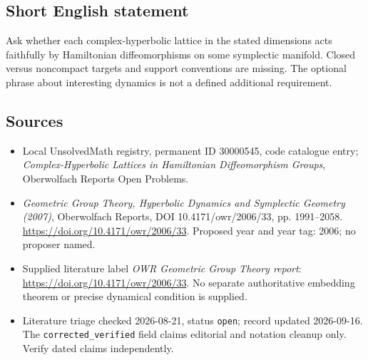 \documentclass[11pt]{article}
\begin{document}
\subsection{Short English statement}
Ask whether each complex-hyperbolic lattice in the stated dimensions acts faithfully by Hamiltonian diffeomorphisms on some symplectic manifold. Closed versus noncompact targets and support conventions are missing. The optional phrase about interesting dynamics is not a defined additional requirement.
\subsection{Sources}
\begin{itemize}\item Local UnsolvedMath registry, permanent ID 30000545, code catalogue entry; \emph{Complex-Hyperbolic Lattices in Hamiltonian Diffeomorphism Groups}, Oberwolfach Reports Open Problems.\item \emph{Geometric Group Theory, Hyperbolic Dynamics and Symplectic Geometry (2007)}, Oberwolfach Reports, DOI 10.4171/owr/2006/33, pp. 1991--2058. \url{https://doi.org/10.4171/owr/2006/33}. Proposed year and year tag: 2006; no proposer named.\item Supplied literature label \emph{OWR Geometric Group Theory report}: \url{https://doi.org/10.4171/owr/2006/33}. No separate authoritative embedding theorem or precise dynamical condition is supplied.\item Literature triage checked 2026-08-21, status \texttt{open}; record updated 2026-09-16. The \texttt{corrected\_verified} field claims editorial and notation cleanup only. Verify dated claims independently.\end{itemize}
\end{document}
